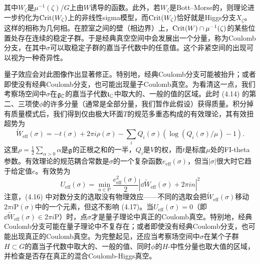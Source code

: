 其中$W_\zeta$是$\mu^{-1}(\zeta)/G$上由$W$诱导的函数。此外，若$W_\zeta$是Bott–Morse的，则理论进一步约化为$\operatorname{Crit}(W_\zeta)$上的非线性sigma模型，而$\operatorname{Crit}(W_\zeta)$恰好就是Higgs分支$X_\zeta$。这样的相称为几何相。在腔室之间的壁（相边界）上，$\operatorname{Crit}(W)\cap\mu^{-1}(\zeta)$的某些位置处存在连续的稳定子群。于是经典真空空间中会发展出一个分量，称为Coulomb分支，在其中$\sigma$可以取稳定子群的嘉当子代数中的任意值。这个非紧空间的出现可以视为一种奇异性。

量子效应会对此图像作出显著修正。特别地，经典Coulomb分支可能被抬升；或者即使没有经典Coulomb分支，也可能出现量子Coulomb真空。为看清这一点，我们考察场空间中$\sigma$在$\mathfrak{g}_{\mathbb{C}}$的嘉当子代数$\mathfrak{t}_{\mathbb{C}}$中取大的、一般的值的区域。此时 (4.14) 的第二、三项使$\phi$的许多分量（通常是全部分量，我们暂作此假设）获得质量。积分掉有质量模式后，我们得到仅由极大环面$T$的规范多重态构成的有效理论，其有效扭超势为
\begin{equation}
\widetilde{W}_{\text{eff}}(\sigma)=-t(\sigma)+2\pi i\rho(\sigma)-\sum_iQ_i(\sigma)\left(\log(Q_i(\sigma)/\mu)-1\right).
\tag{4.16}
\end{equation}
这里$\rho=\frac{1}{2}\sum_{\alpha>0}\alpha$是$\mathfrak{g}$的正根之和的一半，$Q_i$是$V$的权，而$t$是标度$\mu$处的FI-theta参数。有效理论的规范耦合常数是$\sigma$的一个复杂函数$e_{\text{eff}}(\sigma)$，但当$|\sigma|$很大时它趋于给定值$e$。有效势为
\begin{equation}
U_{\text{eff}}(\sigma)=\min_{n\in\mathrm{P}}\frac{e^2_{\text{eff}}(\sigma)}{2}\left|\dd\widetilde{W}_{\text{eff}}(\sigma)+2\pi in\right|^2
\tag{4.17}
\end{equation}
注意，(4.16) 中对数分支的选取没有物理效应——不同的选取会把$\widetilde{W}_{\text{eff}}(\sigma)$移动$2\pi i\mathrm{P}(\sigma)$中的一个元素，但这不影响 (4.17)。当$U_{\text{eff}}(\sigma)=0$（即$\dd\widetilde{W}_{\text{eff}}(\sigma)\in2\pi i\mathrm{P}$）时，点$\sigma$才是量子理论中真正的Coulomb真空。特别地，经典Coulomb分支可能在量子理论中不复存在；或者即使没有经典Coulomb分支，也可能出现真正的Coulomb真空。为完整起见，还应当考察场空间中$\sigma$在某个子群$H\subset G$的嘉当子代数中取大的、一般的值、同时$\phi$的$H$-中性分量也取大值的区域，并检查是否存在真正的混合Coulomb-Higgs真空。


